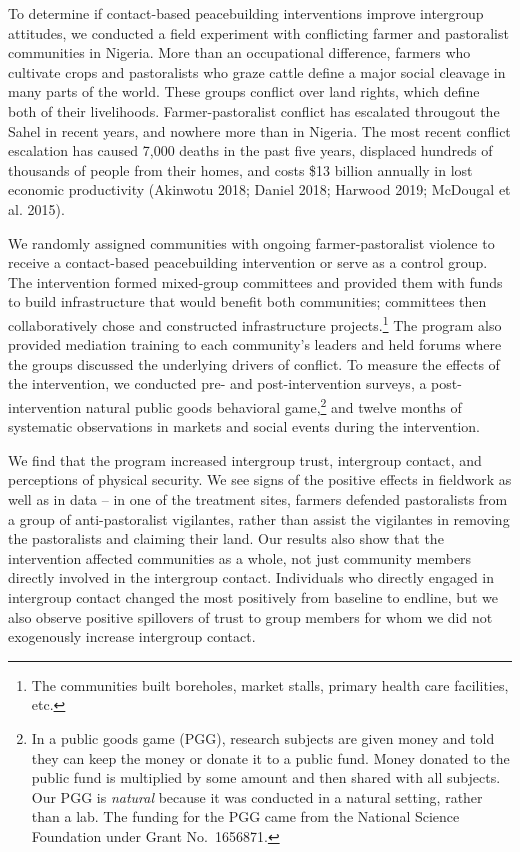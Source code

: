 \documentclass[11pt]{article}
\begin{document}
To determine if contact-based peacebuilding interventions improve
intergroup attitudes, we conducted a field experiment with conflicting
farmer and pastoralist communities in Nigeria. More than an occupational
difference, farmers who cultivate crops and pastoralists who graze
cattle define a major social cleavage in many parts of the world. These
groups conflict over land rights, which define both of their
livelihoods. Farmer-pastoralist conflict has escalated througout the
Sahel in recent years, and nowhere more than in Nigeria. The most recent
conflict escalation has caused 7,000 deaths in the past five years,
displaced hundreds of thousands of people from their homes, and costs
\$13 billion annually in lost economic productivity (Akinwotu 2018;
Daniel 2018; Harwood 2019; McDougal et al. 2015).

We randomly assigned communities with ongoing farmer-pastoralist
violence to receive a contact-based peacebuilding intervention or serve
as a control group. The intervention formed mixed-group committees and
provided them with funds to build infrastructure that would benefit both
communities; committees then collaboratively chose and constructed
infrastructure projects.\footnote{The communities built boreholes,
  market stalls, primary health care facilities, etc.} The program also
provided mediation training to each community's leaders and held forums
where the groups discussed the underlying drivers of conflict. To
measure the effects of the intervention, we conducted pre- and
post-intervention surveys, a post-intervention natural public goods
behavioral game,\footnote{In a public goods game (PGG), research
  subjects are given money and told they can keep the money or donate it
  to a public fund. Money donated to the public fund is multiplied by
  some amount and then shared with all subjects. Our PGG is
  \emph{natural} because it was conducted in a natural setting, rather
  than a lab. The funding for the PGG came from the National Science
  Foundation under Grant No.~1656871.} and twelve months of systematic
observations in markets and social events during the intervention.

We find that the program increased intergroup trust, intergroup contact,
and perceptions of physical security. We see signs of the positive
effects in fieldwork as well as in data -- in one of the treatment
sites, farmers defended pastoralists from a group of anti-pastoralist
vigilantes, rather than assist the vigilantes in removing the
pastoralists and claiming their land. Our results also show that the
intervention affected communities as a whole, not just community members
directly involved in the intergroup contact. Individuals who directly
engaged in intergroup contact changed the most positively from baseline
to endline, but we also observe positive spillovers of trust to group
members for whom we did not exogenously increase intergroup contact.
\end{document}

